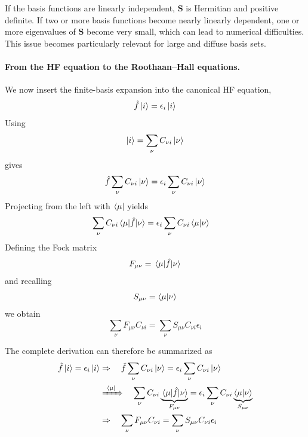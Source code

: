 \documentclass[11pt,a4paper,titlepage]{article}
\numberwithin{equation}{section}
\newcommand{\bS}{\boldsymbol{S}}
\newcommand{\hf}{\Hat{f}}
\begin{document}
If the basis functions are linearly independent, $\bS$ is Hermitian and
positive definite. If two or more basis functions become nearly linearly
dependent, one or more eigenvalues of $\bS$ become very small, which can
lead to numerical difficulties. This issue becomes particularly relevant
for large and diffuse basis sets.


\paragraph{From the HF equation to the Roothaan--Hall equations.}

We now insert the finite-basis expansion into the canonical HF equation,
\begin{equation}
  \hf\ket{i}
  =
  \epsilon_i\ket{i}
\end{equation}
Using
\begin{equation}
  \ket{i}
  =
  \sum_\nu
  C_{\nu i}\ket{\nu}
\end{equation}
gives
\begin{equation}
  \hf
  \sum_\nu
  C_{\nu i}\ket{\nu}
  =
  \epsilon_i
  \sum_\nu
  C_{\nu i}\ket{\nu}
\end{equation}
Projecting from the left with $\bra{\mu}$ yields
\begin{equation}
\begin{split}
  \sum_\nu
  C_{\nu i}
  \mel{\mu}{\hf}{\nu}
  &=
  \epsilon_i
  \sum_\nu
  C_{\nu i}
  \braket{\mu}{\nu}
\end{split}
\end{equation}
Defining the Fock matrix
\begin{equation}
  F_{\mu\nu}
  =
  \mel{\mu}{\hf}{\nu}
  \label{eq:fock-matrix-definition}
\end{equation}
and recalling
\begin{equation}
  S_{\mu\nu}
  =
  \braket{\mu}{\nu}
\end{equation}
we obtain
\begin{equation}
  \sum_\nu
  F_{\mu\nu}
  C_{\nu i}
  =
  \sum_\nu
  S_{\mu\nu}
  C_{\nu i}
  \epsilon_i
  \label{eq:roothaan-hall-index}
\end{equation}

The complete derivation can therefore be summarized as
\begin{equation}
\begin{split}
  \hf\ket{i}
  =
  \epsilon_i\ket{i}
  &\Rightarrow\quad
  \hf
  \sum_\nu
  C_{\nu i}\ket{\nu}
  =
  \epsilon_i
  \sum_\nu
  C_{\nu i}\ket{\nu}
  \\
  &\xRightarrow{\ \bra{\mu}\ }\quad
  \sum_\nu
  C_{\nu i}
  \underbrace{
    \mel{\mu}{\hf}{\nu}
  }_{F_{\mu\nu}}
  =
  \epsilon_i
  \sum_\nu
  C_{\nu i}
  \underbrace{
    \braket{\mu}{\nu}
  }_{S_{\mu\nu}}
  \\
  &\Rightarrow\quad
  \sum_\nu
  F_{\mu\nu}C_{\nu i}
  =
  \sum_\nu
  S_{\mu\nu}C_{\nu i}\epsilon_i
\end{split}
\end{equation}
\end{document}
